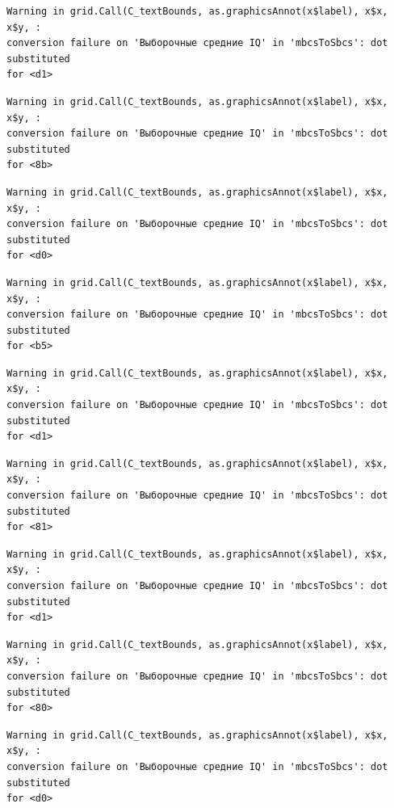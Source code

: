 \documentclass[
  letterpaper,
  DIV=11,
  numbers=noendperiod]{scrreprt}
\theoremstyle{definition}
\theoremstyle{remark}
\begin{document}
\begin{verbatim}
Warning in grid.Call(C_textBounds, as.graphicsAnnot(x$label), x$x, x$y, :
conversion failure on 'Выборочные средние IQ' in 'mbcsToSbcs': dot substituted
for <d1>
\end{verbatim}

\begin{verbatim}
Warning in grid.Call(C_textBounds, as.graphicsAnnot(x$label), x$x, x$y, :
conversion failure on 'Выборочные средние IQ' in 'mbcsToSbcs': dot substituted
for <8b>
\end{verbatim}

\begin{verbatim}
Warning in grid.Call(C_textBounds, as.graphicsAnnot(x$label), x$x, x$y, :
conversion failure on 'Выборочные средние IQ' in 'mbcsToSbcs': dot substituted
for <d0>
\end{verbatim}

\begin{verbatim}
Warning in grid.Call(C_textBounds, as.graphicsAnnot(x$label), x$x, x$y, :
conversion failure on 'Выборочные средние IQ' in 'mbcsToSbcs': dot substituted
for <b5>
\end{verbatim}

\begin{verbatim}
Warning in grid.Call(C_textBounds, as.graphicsAnnot(x$label), x$x, x$y, :
conversion failure on 'Выборочные средние IQ' in 'mbcsToSbcs': dot substituted
for <d1>
\end{verbatim}

\begin{verbatim}
Warning in grid.Call(C_textBounds, as.graphicsAnnot(x$label), x$x, x$y, :
conversion failure on 'Выборочные средние IQ' in 'mbcsToSbcs': dot substituted
for <81>
\end{verbatim}

\begin{verbatim}
Warning in grid.Call(C_textBounds, as.graphicsAnnot(x$label), x$x, x$y, :
conversion failure on 'Выборочные средние IQ' in 'mbcsToSbcs': dot substituted
for <d1>
\end{verbatim}

\begin{verbatim}
Warning in grid.Call(C_textBounds, as.graphicsAnnot(x$label), x$x, x$y, :
conversion failure on 'Выборочные средние IQ' in 'mbcsToSbcs': dot substituted
for <80>
\end{verbatim}

\begin{verbatim}
Warning in grid.Call(C_textBounds, as.graphicsAnnot(x$label), x$x, x$y, :
conversion failure on 'Выборочные средние IQ' in 'mbcsToSbcs': dot substituted
for <d0>
\end{verbatim}
\end{document}
